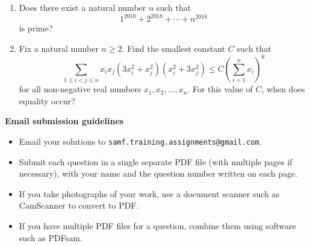 \documentclass{article}
\begin{document}
\begin{enumerate}[1.]
\vspace{6pt}
\item
Does there exist a natural number $n$ such that
\[
	1^{2018} + 2^{2018} + \cdots + n^{2018}
\]
is prime?


\vspace{6pt}
\item %
Fix a natural number $n \geq 2$. Find the smallest constant $C$ such that
\[
	 \sum_{1 \leq i < j \leq n} x_i x_j (3x_i^2 + x_j^2)(x_i^2 + 3x_j^2) \leq C {\left( \sum_{i = 1}^{n} x_i \right)}^6
\]
for all non-negative real numbers $x_1, x_2, \dots, x_n$. For this value of $C$, when does equality occur?

\end{enumerate}


\vfill
\textbf{\Large Email submission guidelines}
\begin{itemize}
	\item Email your solutions to \verb!samf.training.assignments@gmail.com!.
	\item Submit each question in a single separate PDF file (with multiple pages if necessary), with your name and the question number written on each page.
	\item If you take photographs of your work, use a document scanner such as CamScanner to convert to PDF.
	\item If you have multiple PDF files for a question, combine them using software such as PDFsam.
\end{itemize}
\end{document}
